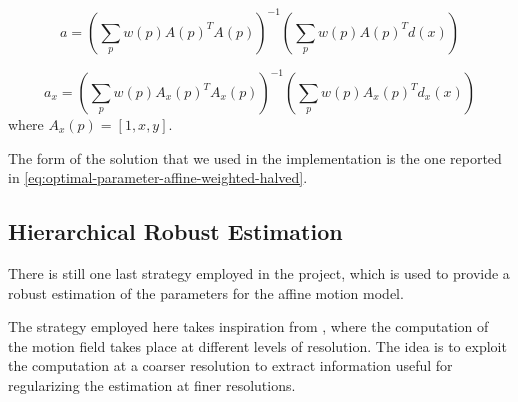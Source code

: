 \begin{equation}
    \label{eq:optimal-parameter-affine-weighted}
    a = \left (\sum_p w(p) A(p)^T A(p) \right )^{-1} \left (\sum_p w(p) A(p)^T d(x) \right)
\end{equation}

\begin{equation}
    \label{eq:optimal-parameter-affine-weighted-halved}
    a_x = \left (\sum_p w(p) A_x(p)^T A_x(p) \right )^{-1} \left (\sum_p w(p) A_x(p)^T d_x(x) \right)
\end{equation}
where $A_x(p) = [1,x,y]$.

The form of the solution that we used in the implementation is the one reported in \cref{eq:optimal-parameter-affine-weighted-halved}.

\subsection{Hierarchical Robust Estimation}
There is still one last strategy employed in the project, which is used to provide a robust estimation of the parameters for the affine motion model.

The strategy employed here takes inspiration from \cite{Dufeaux2000}, where the computation of the motion field takes place at different levels of resolution. The idea is to exploit the computation at a coarser resolution to extract information useful for regularizing the estimation at finer resolutions.
